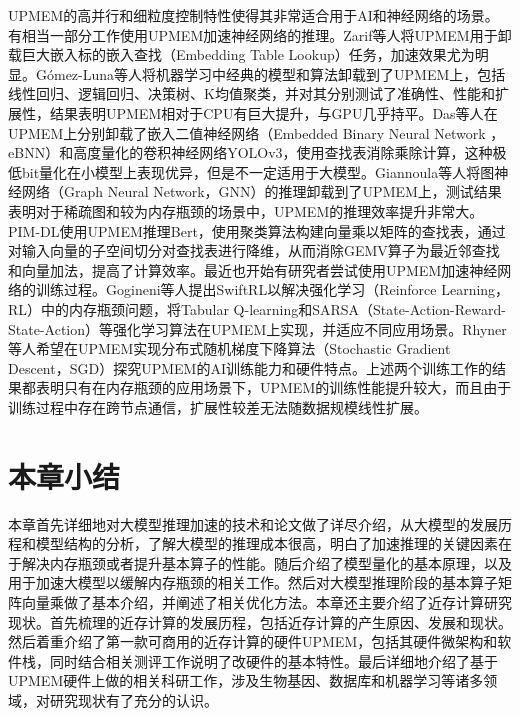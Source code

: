 UPMEM的高并行和细粒度控制特性使得其非常适合用于AI和神经网络的场景。有相当一部分工作使用UPMEM加速神经网络的推理。Zarif等人\cite{UPMEMEmbeddingLookups}将UPMEM用于卸载巨大嵌入标的嵌入查找（Embedding Table Lookup）任务，加速效果尤为明显。Gómez-Luna等人\cite{UPMEMTraditionalML}将机器学习中经典的模型和算法卸载到了UPMEM上，包括线性回归、逻辑回归、决策树、K均值聚类，并对其分别测试了准确性、性能和扩展性，结果表明UPMEM相对于CPU有巨大提升，与GPU几乎持平。Das等人\cite{UPMEMCNN}在UPMEM上分别卸载了嵌入二值神经网络（Embedded Binary Neural Network ，eBNN）和高度量化的卷积神经网络YOLOv3，使用查找表消除乘除计算，这种极低bit量化在小模型上表现优异，但是不一定适用于大模型。Giannoula等人\cite{UPMEMGNN}将图神经网络（Graph Neural Network，GNN）的推理卸载到了UPMEM上，测试结果表明对于稀疏图和较为内存瓶颈的场景中，UPMEM的推理效率提升非常大。PIM-DL\cite{PIM-DL}使用UPMEM推理Bert，使用聚类算法构建向量乘以矩阵的查找表，通过对输入向量的子空间切分对查找表进行降维，从而消除GEMV算子为最近邻查找和向量加法，提高了计算效率。最近也开始有研究者尝试使用UPMEM加速神经网络的训练过程。Gogineni等人\cite{SwiftRL}提出SwiftRL以解决强化学习（Reinforce Learning，RL）中的内存瓶颈问题，将Tabular Q-learning和SARSA（State-Action-Reward-State-Action）等强化学习算法在UPMEM上实现，并适应不同应用场景。Rhyner等人\cite{PIM-Opt}希望在UPMEM实现分布式随机梯度下降算法（Stochastic Gradient Descent，SGD）探究UPMEM的AI训练能力和硬件特点。上述两个训练工作的结果都表明只有在内存瓶颈的应用场景下，UPMEM的训练性能提升较大，而且由于训练过程中存在跨节点通信，扩展性较差无法随数据规模线性扩展。

\section{本章小结}
本章首先详细地对大模型推理加速的技术和论文做了详尽介绍，从大模型的发展历程和模型结构的分析，了解大模型的推理成本很高，明白了加速推理的关键因素在于解决内存瓶颈或者提升基本算子的性能。随后介绍了模型量化的基本原理，以及用于加速大模型以缓解内存瓶颈的相关工作。然后对大模型推理阶段的基本算子矩阵向量乘做了基本介绍，并阐述了相关优化方法。本章还主要介绍了近存计算研究现状。首先梳理的近存计算的发展历程，包括近存计算的产生原因、发展和现状。然后着重介绍了第一款可商用的近存计算的硬件UPMEM，包括其硬件微架构和软件栈，同时结合相关测评工作说明了改硬件的基本特性。最后详细地介绍了基于UPMEM硬件上做的相关科研工作，涉及生物基因、数据库和机器学习等诸多领域，对研究现状有了充分的认识。